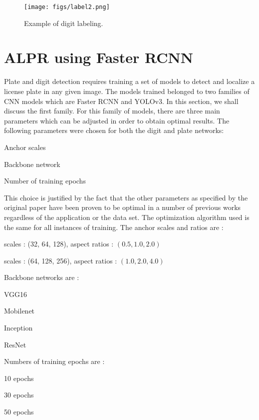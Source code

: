 \begin{figure}[!htpb]
	\centering
	\texttt{[image: figs/label2.png]}
	\caption{Example of digit labeling.}\label{fig:label2}
\end{figure}

\section{ALPR using Faster RCNN} \label{subsection:ufrcc}
Plate and digit detection requires training a set of models to detect and localize a license plate in any given image. The models trained belonged to two families of CNN models which are Faster RCNN and YOLOv3. In this section, we shall discuss the first family. For this family of models, there are three  main parameters which can be adjusted in order to obtain optimal results. The following parameters were chosen for both the digit and plate networks:

\begin{compactitem}
	\item Anchor scales
	\item Backbone network
	\item Number of training epochs
\end{compactitem}

This choice is justified by the fact that the other parameters as specified by the original paper have been proven to be optimal in a number of previous works regardless of the application or the data set.
The optimization algorithm used is the same for all instances of training. The anchor scales and ratios are :

\begin{compactitem}
	\item scales : (32, 64, 128), aspect ratios : $(0.5, 1.0, 2.0)$
	\item scales : (64, 128, 256), aspect ratios : $(1.0, 2.0, 4.0)$
\end{compactitem}
Backbone networks are :

\begin{compactitem}
	\item VGG16
	\item Mobilenet
	\item Inception
	\item ResNet
\end{compactitem}
Numbers of training epochs are :

\begin{compactitem}
	\item 10 epochs
	\item 30 epochs
	\item 50 epochs
\end{compactitem}

